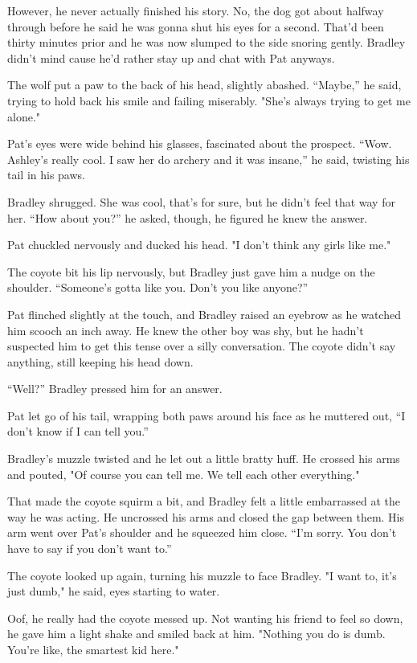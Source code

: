 However, he never actually finished his story. No, the dog got about
halfway through before he said he was gonna shut his eyes for a second.
That'd been thirty minutes prior and he was now slumped to the side
snoring gently. Bradley didn't mind cause he'd rather stay up and chat
with Pat anyways.

The wolf put a paw to the back of his head, slightly abashed. ``Maybe,''
he said, trying to hold back his smile and failing miserably. "She's
always trying to get me alone."

Pat's eyes were wide behind his glasses, fascinated about the prospect.
``Wow. Ashley's really cool. I saw her do archery and it was insane,'' he
said, twisting his tail in his paws.

Bradley shrugged. She was cool, that's for sure, but he didn't feel that
way for her. ``How about you?'' he asked, though, he figured he knew the
answer.

Pat chuckled nervously and ducked his head. "I don't think any girls
like me."

The coyote bit his lip nervously, but Bradley just gave him a nudge on
the shoulder. ``Someone's gotta like you. Don't you like anyone?''

Pat flinched slightly at the touch, and Bradley raised an eyebrow as he
watched him scooch an inch away. He knew the other boy was shy, but he
hadn't suspected him to get this tense over a silly conversation. The
coyote didn't say anything, still keeping his head down.

``Well?'' Bradley pressed him for an answer.

Pat let go of his tail, wrapping both paws around his face as he
muttered out, ``I don't know if I can tell you.''

Bradley's muzzle twisted and he let out a little bratty huff. He crossed
his arms and pouted, "Of course you can tell me. We tell each other
everything."

That made the coyote squirm a bit, and Bradley felt a little embarrassed
at the way he was acting. He uncrossed his arms and closed the gap
between them. His arm went over Pat's shoulder and he squeezed him
close. ``I'm sorry. You don't have to say if you don't want to.''

The coyote looked up again, turning his muzzle to face Bradley. "I want
to, it's just dumb," he said, eyes starting to water.

Oof, he really had the coyote messed up. Not wanting his friend to feel
so down, he gave him a light shake and smiled back at him. "Nothing you
do is dumb. You're like, the smartest kid here."

